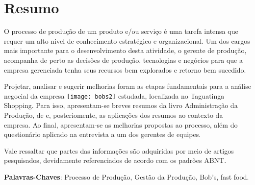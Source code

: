 \chapter[Resumo]{Resumo}
\label{chap:resumo}
	
	O processo de produção de um produto e/ou serviço é uma tarefa intensa que requer um alto nivel de conhecimento estratégico e organizacional. Um dos cargos mais importante para o desenvolvimento desta atividade, o gerente de produção, acompanha de perto as decisões de produção, tecnologias e negócios para que a empresa gerenciada tenha seus recursos bem explorados e retorno bem sucedido.

	Projetar, analisar e sugerir melhorias foram as etapas fundamentais para a análise negocial da empresa \texttt{[image: bobs2]} estudada, localizada no Taguatinga Shopping. Para isso, apresentam-se breves resumos da livro Administração da Produção, de \cite{slack} e, posteriomente, as aplicações dos resumos ao contexto da empresa. Ao final, apresentam-se as melhorias propostas ao processo, além do questionário aplicado na entrevista a um dos gerentes de equipes.

	Vale ressaltar que partes das informações são adquiridas por meio de artigos pesquisados, devidamente referenciados de acordo com os padrões ABNT.

	\begin{flushleft}
		\textbf{Palavras-Chaves}: Processo de Produção, Gestão da Produção, Bob's, fast food.
	\end{flushleft}
	